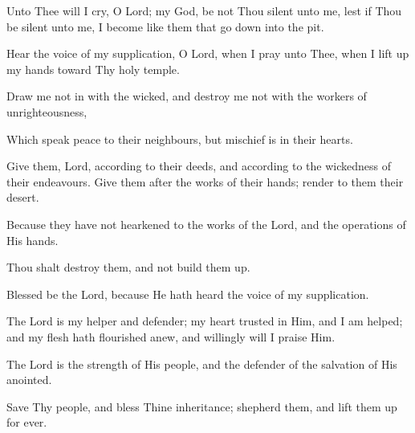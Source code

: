 Unto Thee will I cry, O Lord; my God, be not Thou silent unto me, lest if Thou be silent unto me, I become like them that go down into the pit.

Hear the voice of my supplication, O Lord, when I pray unto Thee, when I lift up my hands toward Thy holy temple.

Draw me not in with the wicked, and destroy me not with the workers of unrighteousness,

Which speak peace to their neighbours, but mischief is in their hearts.

Give them, Lord, according to their deeds, and according to the wickedness of their endeavours. Give them after the works of their hands; render to them their desert.

Because they have not hearkened to the works of the Lord, and the operations of His hands.

Thou shalt destroy them, and not build them up.

Blessed be the Lord, because He hath heard the voice of my supplication.

The Lord is my helper and defender; my heart trusted in Him, and I am helped; and my flesh hath flourished anew, and willingly will I praise Him.

The Lord is the strength of His people, and the defender of the salvation of His anointed.

Save Thy people, and bless Thine inheritance; shepherd them, and lift them up for ever.

